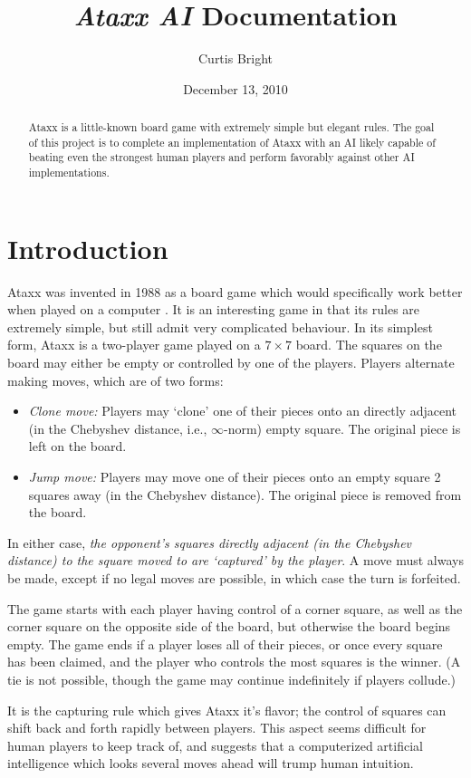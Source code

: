 \documentclass[12pt]{article}
\title{\textsl{Ataxx AI} Documentation}
\author{Curtis Bright}
\date{December 13, 2010}
\begin{document}
\maketitle
\begin{abstract}
Ataxx is a little-known board game with extremely simple but elegant rules.  The goal of this project is to complete an implementation of Ataxx with an AI likely capable of beating even the strongest human players and perform favorably against other AI implementations.
\end{abstract}
\section{Introduction}
Ataxx was invented in 1988 as a board game which would specifically work better when played on a computer \cite{pressibus}.  It is an interesting game in that its rules are extremely simple, but still admit very complicated behaviour.  In its simplest form, Ataxx is a two-player game played on a $7\times7$ board.  The squares on the board may either be empty or controlled by one of the players.  Players alternate making moves, which are of two forms:
\begin{itemize}
\item\emph{Clone move:} Players may `clone' one of their pieces onto an directly adjacent (in the Chebyshev distance, i.e., $\infty$-norm) empty square.  The original piece is left on the board.
\item\emph{Jump move:} Players may move one of their pieces onto an empty square 2 squares away (in the Chebyshev distance).  The original piece is removed from the board.
\end{itemize}
In either case, \emph{the opponent's squares directly adjacent (in the Chebyshev distance) to the square moved to are `captured' by the player}.  A move must always be made, except if no legal moves are possible, in which case the turn is forfeited.

The game starts with each player having control of a corner square, as well as the corner square on the opposite side of the board, but otherwise the board begins empty.
The game ends if a player loses all of their pieces, or once every square has been claimed, and the player who controls the most squares is the winner.  (A tie is not possible, though the game may continue indefinitely if players collude.)

It is the capturing rule which gives Ataxx it's flavor; the control of squares can shift back and forth rapidly between players.  This aspect seems difficult for human players to keep track of, and suggests that a computerized artificial intelligence which looks several moves ahead will trump human intuition.
\end{document}
